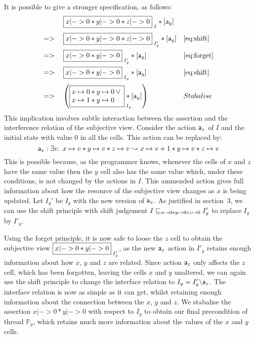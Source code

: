 It is possible to give a  stronger specification, as follows: 
\[
\begin{array}{lll}
 & \shared{x|-> 0 * y|->0 * z|-> 0}{I} *[\token a_y]&\\[1em]
=> & \shared{x|-> 0 * y|->0 * z|-> 0}{I'_y} *[\token a_y ]&\eqref{eq:shift}\\[1em]
 => & \shared{x|-> 0 * y|->0 }{I'_y} *[\token a_y]
 &\eqref{eq:forget}\\[1em]
=> & \shared{x|-> 0 * y|->0 }{I_y} *[\token a_y]
 &\eqref{eq:shift}\\[1em]
 =>\null&
    \left(\shared{\begin{array}{@{}l<{\null}@{}l<{\null}@{}}\cell{x}{0} *
        \cell{y}{0} \lor\\ \cell{x}{1} *
        \cell{y}{0}\end{array}}{I_y}\!\!\!\!\!\! * [\token a_y]\right) &
  Stabalise
\end{array}
\]
This implication involves subtle interaction between the assertion and
the interference relation of the subjective view. 
Consider the action 
$\mathsf{a}_x$ 
of $I$ and the initial state with value $0$ in all the cells. This
action can be replaced by:
\[
\mathsf{a}_x : \exists v.\, \; 
x \mapsto v * y \mapsto v * z \mapsto v
\mathrel{\leadsto}
x \mapsto v+1 * y \mapsto v * z \mapsto v
\]
This is possible  because, as the programmer knows, whenever the cells
of $x$ and
$z$ have the same value then the $y$ cell also has the same value which, under these
conditions, is not changed by the actions in $I$. This ammended action  gives full information about how the resource of
the subjective view changes as $x$ is being updated. 
  Let  $I_y' $ be  $I_y$ with the new version of $\mathsf{a}_x$.
As  justified in section~3, we can 
use  the shift principle with  shift judgement 
$
I\sqsubseteq_{x \mapsto 0 * y \mapsto 0 * z \mapsto 0} I_y'
$
to replace $I_y$ by $I'_y$. 




Using the forget principle,  it is now safe to loose the $z$ cell to
obtain the subjective view  $\shared{x|-> 0 * y|->0 }{I'_y}$,  as 
the new $\mathsf{a}_x$ action in $I'_y$ retains enough information about how
$x$, $y$ and $z$ are related.
Since action $\mathsf{a}_z$ only affects the $z$ cell, which has been
forgotten, leaving  the cells $x$ and $y$ unaltered, we can again use the
shift principle to change  the interface
relation to $I_y = I'_y \backslash \mathsf{a}_z$. The interface relation
is now as simple as it can get, whilst retaining enough information
about the 
connection between the $x$, $y$ and $z$. We   stabalise
the 
assertion $x|-> 0 * y|->0$ with respect to $I_y$ to obtain our final
precondition of thread $\mathbb{P}_y$, which retains much more
information about the values of the $x$ and $y$ cells. 







